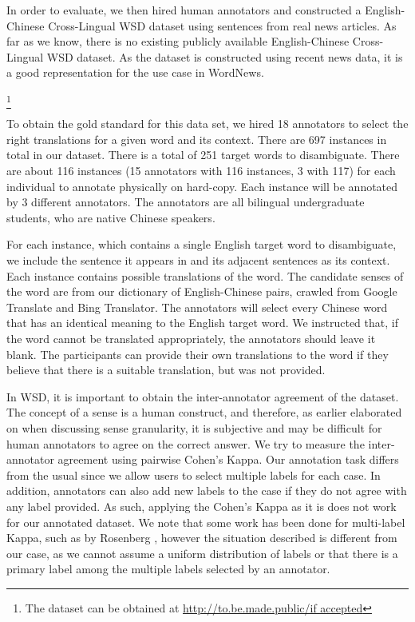 \documentclass[11pt]{article}
\begin{document}
In order to evaluate, we then hired human annotators and constructed a English-Chinese Cross-Lingual WSD dataset using sentences from real news articles. As far as we know, there is no existing publicly available English-Chinese Cross-Lingual WSD dataset. As the dataset is constructed using recent news data, it is a good representation for the use case in WordNews. {\footnote{The dataset can be obtained at %
{\url{http://to.be.made.public/if accepted}}}

To obtain the gold standard for this data set, we hired 18 annotators to select the right translations for a given word and its context. There are 697 instances in total in our dataset. There is a total of 251 target words to disambiguate. There are about 116 instances (15 annotators with 116 instances, 3 with 117) for each individual to annotate physically on hard-copy. Each instance will be annotated by 3 different annotators. The annotators are all bilingual undergraduate students, who are native Chinese speakers. 

For each instance, which contains a single English target word to disambiguate, we include the sentence it appears in and its adjacent sentences as its context. Each instance contains possible translations of the word. The candidate senses of the word are from our dictionary of English-Chinese pairs, crawled from Google Translate and Bing Translator. The annotators will select every Chinese word that has an identical meaning to the English target word. We instructed that, if the word cannot be translated appropriately, the annotators should leave it blank. The participants can provide their own translations to the word if they believe that there is a suitable translation, but was not provided. 


In WSD, it is important to obtain the inter-annotator agreement of the dataset. The concept of a sense is a human construct, and therefore, as earlier elaborated on when discussing sense granularity, it is subjective and may be difficult for human annotators to agree on the correct answer. We try to measure the inter-annotator agreement using pairwise Cohen's Kappa. Our annotation task differs from the usual since we allow users to select multiple labels for each case. In addition, annotators can also add new labels to the case if they do not agree with any label provided. As such, applying the Cohen's Kappa as it is does not work for our annotated dataset. We note that some work has been done for multi-label Kappa, such as by Rosenberg , however the situation described  is different from our case, as we cannot assume a uniform distribution of labels or that there is a primary label among the multiple labels selected by an annotator. 

}
\end{document}
